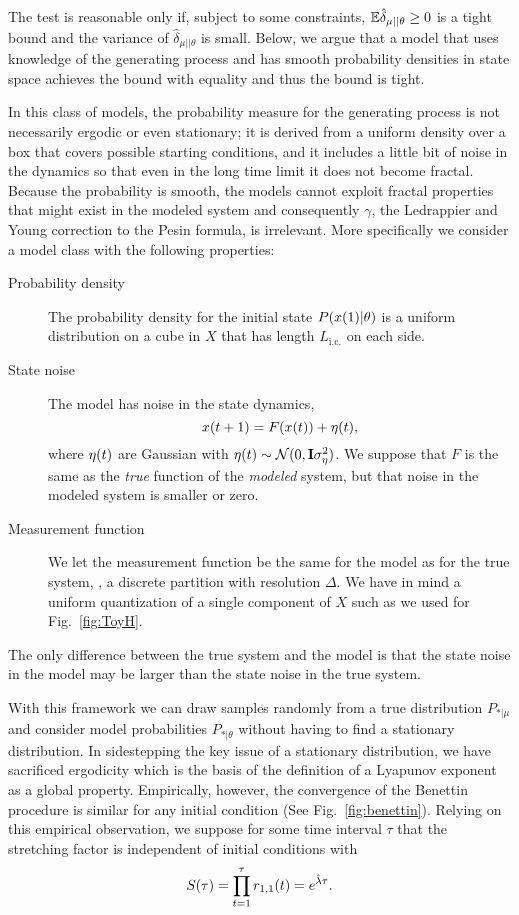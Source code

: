 The test is reasonable only if, subject to some constraints, $\mathbb{E} \hat
\delta_{\mu||\theta} \geq 0$ is a tight bound and the variance of
$\hat \delta_{\mu||\theta}$ is small.  Below, we argue that a model
that uses knowledge of the generating process and has smooth
probability densities in state space achieves the bound with equality
and thus the bound is tight.

In this class of models, the probability measure for the generating
process is not necessarily ergodic or even stationary; it is derived
from a uniform density over a box that covers possible starting
conditions, and it includes a little bit of noise in the dynamics so
that even in the long time limit it does not become fractal.  Because
the probability is smooth, the models cannot exploit fractal
properties that might exist in the modeled system and consequently
$\gamma$, the Ledrappier and Young correction to the Pesin formula, is
irrelevant.  More specifically we consider a model class with the
following properties: \newcommand{\Lic}{L_{\text{i.c.}}}
\begin{description}
\item[Probability density] The probability density for the initial
  state $P({x}{(1)}|\theta)$ is a uniform distribution on a cube in
  $X$ that has length $\Lic$ on each side.
\item[State noise] The model has noise in the state dynamics,
  \begin{equation}
    \label{eq:PracticalStateMap}
    {x}{(t+1)} = F({x}{(t)}) + {\eta}{(t)},
  \end{equation}
  where ${\eta}{(t)}$ are \iid Gaussian with ${\eta}{(t)} \sim
  {\mathcal{N}}(0,{\bf I} \sigma_\eta^2)$.  We suppose that $F$ is the same as
  the \emph{true} function of the \emph{modeled} system, but that
  noise in the modeled system is smaller or zero.
\item[Measurement function] We let the measurement function be the
  same for the model as for the true system, \ie, a discrete partition
  with resolution $\Delta$.  We have in mind a uniform quantization of
  a single component of $X$ such as we used for Fig.~\ref{fig:ToyH}.
\end{description}
The only difference between the true system and the model is that the
state noise in the model may be larger than the state noise in the
true system.

With this framework we can draw samples randomly from a true
distribution $P_{*|\mu}$ and consider model probabilities
$P_{*|\theta}$ without having to find a stationary distribution.  In
sidestepping the key issue of a stationary distribution, we have
sacrificed ergodicity which is the basis of the definition of a
Lyapunov exponent as a global property.  Empirically, however, the
convergence of the Benettin procedure is similar for any initial
condition (See Fig.~\ref{fig:benettin}).  Relying on this empirical
observation, we suppose for some time interval $\tau$ that the
stretching factor is independent of initial conditions with
\begin{equation}
  \label{eq:Stretch}
  {S}{(\tau)} = \prod_{t=1}^\tau {r_{1,1}}{(t)} = e^{\hat \lambda \tau}.
\end{equation}

